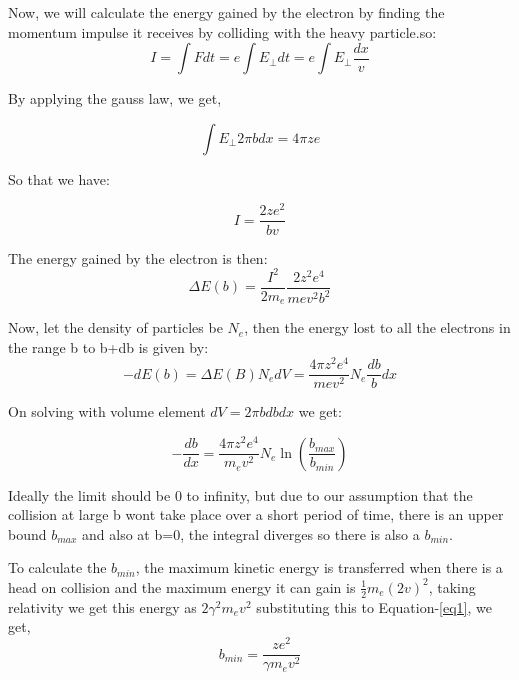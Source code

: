 \documentclass{article}
\begin{document}
\begin{multicols}{2}
Now, we will calculate the energy gained by the electron by finding the momentum impulse
it receives by colliding with the heavy particle.so:
\begin{equation}
    I = \int F dt = e\int E_{\perp} dt =e\int E_{\perp} \frac{dx}{v}
\end{equation}



By applying the gauss law, we get,

\begin{equation}
    \int E_{\perp} 2\pi bdx = 4\pi ze 
\end{equation}

So that we have:

\begin{equation}
    I = \frac{2ze^2}{bv}
\end{equation}

The energy gained by the electron is then:
\begin{equation}
    \label{eq1}
    \Delta E(b) = \frac{I^2}{2m_e} \frac{2z^2e^4}{mev^2b^2}
\end{equation}

Now, let the density of particles be $N_e$, then the energy lost to all the electrons
in the range b to b+db is given by:
\begin{equation}
    -dE(b) = \Delta E(B) N_e dV = \frac{4\pi z^2e^4}{mev^2} N_e \frac{db}{b} dx
\end{equation}

On solving with volume element $dV = 2\pi b db dx$ we get:

\begin{equation}
    -\frac{db}{dx} = \frac{4\pi z^2 e^4}{m_e v^2}N_e \ln{(\frac{b_{max}}{b_{min}})}
    \label{bmaxbmin}
\end{equation}

Ideally the limit should be 0 to infinity, but due to our assumption that
the collision at large b wont take place over a short period of time, there is an upper bound
$b_{max}$ and also at b=0, the integral diverges so there is also a $b_{min}$.

To calculate the $b_{min}$, the maximum kinetic energy is transferred when there is
a head on collision and the maximum energy it can gain is $\frac{1}{2}m_e (2v)^2$,
taking relativity we get this energy as $2\gamma^2 m_e v^2 $
substituting this to Equation-\ref{eq1}, we get,
\begin{equation}
    b_{min} = \frac{ze^2}{\gamma m_e v^2}
\end{equation}




\end{multicols}
\end{document}

